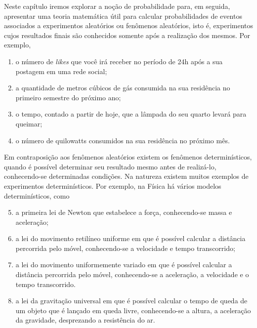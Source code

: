 \label{conceitosbasicos}
Neste capítulo iremos explorar a noção de probabilidade para, em seguida, apresentar uma teoria matemática útil para calcular probabilidades de eventos associados a experimentos aleatórios ou fenômenos aleatórios, isto é, experimentos cujos resultados finais são conhecidos somente após a realização dos mesmos. Por exemplo,

\begin{enumerate}
\item {} 
o número de \textit{likes} que você irá receber no período de 24h após a sua postagem em uma rede social;

\item {} 
a quantidade de metros cúbicos de gás consumida na sua residência no primeiro semestre do próximo ano;

\item {} 
o tempo, contado a partir de hoje, que a lâmpada do seu quarto levará para queimar;

\item {} 
o número de quilowatts consumidos na sua residência no próximo mês.
\end{enumerate}
Em contraposição aos fenômenos aleatórios existem os fenômenos determinísticos, quando é possível determinar seu resultado mesmo antes de realizá-lo, conhecendo-se determinadas condições. Na natureza existem muitos exemplos de experimentos determinísticos. Por exemplo, na Física há vários modelos determinísticos, como

\begin{enumerate}\setcounter{enumi}{4}
\item {} 
a primeira lei de Newton que estabelece a força, conhecendo-se massa e aceleração;

\item {} 
a lei do movimento retilíneo uniforme em que é possível calcular a distância percorrida pelo móvel, conhecendo-se a velocidade e tempo transcorrido;

\item {} 
a lei do movimento uniformemente variado em que é possível calcular a distância percorrida pelo móvel, conhecendo-se a aceleração, a velocidade e o tempo transcorrido.

\item {} 
a lei da gravitação universal em que é possível calcular o tempo de queda de um objeto que é lançado em queda livre, conhecendo-se a altura, a aceleração da gravidade, desprezando a resistência do ar.

\end{enumerate}

